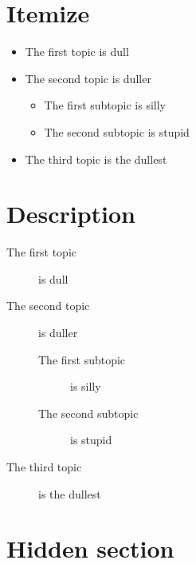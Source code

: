 \section*{Itemize}
\begin{itemize}
\item The first topic is dull
\item The second topic is duller
\begin{itemize}
\item The first subtopic is silly
\item The second subtopic is stupid
\end{itemize}
\item The third topic is the dullest
\end{itemize}

\section*{Description}
\begin{description}
\item[The first topic] is dull
\item[The second topic] is duller
\begin{description}
\item[The first subtopic] is silly
\item[The second subtopic] is stupid
\end{description}
\item[The third topic] is the dullest
\end{description}


\clearpage

\tochide\section{Hidden section}



